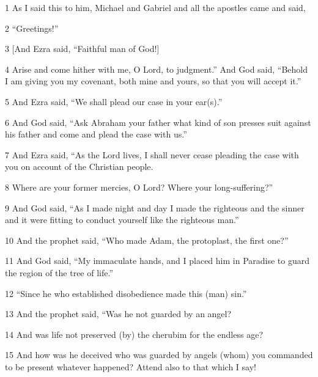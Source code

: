 \par 1 As I said this to him, Michael and Gabriel and all the apostles came and said,

\par 2 “Greetings!” 

\par 3 [And Ezra said, “Faithful man of God!] 

\par 4 Arise and come hither with me, O Lord, to judgment.” And God said, “Behold I am giving you my covenant, both mine and yours, so that you will accept it.”

\par 5 And Ezra said, “We shall plead our case in your ear(s).”

\par 6 And God said, “Ask Abraham your father what kind of son presses suit against his father and come and plead the case with us.”

\par 7 And Ezra said, “As the Lord lives, I shall never cease pleading the case with you on account of the Christian people.

\par 8 Where are your former mercies, O Lord? Where your long-suffering?”

\par 9 And God said, “As I made night and day I made the righteous and the sinner and it were fitting to conduct yourself like the righteous man.”

\par 10 And the prophet said, “Who made Adam, the protoplast, the first one?”

\par 11 And God said, “My immaculate hands, and I placed him in Paradise to guard the region of the tree of life.”

\par 12 “Since he who established disobedience made this (man) sin.”

\par 13 And the prophet said, “Was he not guarded by an angel?

\par 14 And was life not preserved (by) the cherubim for the endless age?

\par 15 And how was he deceived who was guarded by angels (whom) you commanded to be present whatever happened? Attend also to that which I say!

